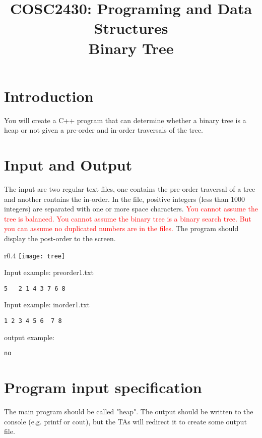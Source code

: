 \documentclass[times,11pt,verbatim,js-singlespace]{article}  %
\title{COSC2430: Programing and Data Structures\\
Binary Tree
}
\date{}
\begin{document}
\pagestyle{plain}
\let\thepage\relax  %

\maketitle

\section{Introduction}
You will create a C++ program that can determine whether a binary tree is a heap or not given a pre-order and in-order traversals of the tree.
\section{Input and Output}
The input are two regular text files, one contains the pre-order traversal of a tree and another contains the in-order. In the file, positive integers (less than 1000 integers) are separated with one or more space characters. \textcolor{red}{You cannot assume the tree is balanced. You cannot assume the binary tree is a binary search tree. But you can assume no duplicated numbers are in the files.} The program should display the post-order to the screen. 


\begin{wrapfigure}{r}{0.4\textwidth}
\hspace{-0.2in}
    \texttt{[image: tree]}
\end{wrapfigure}
Input example: preorder1.txt
\begin{verbatim}
5   2 1 4 3 7 6 8
\end{verbatim}
Input example: inorder1.txt
\begin{verbatim}
1 2 3 4 5 6  7 8
\end{verbatim}
output example:
\begin{verbatim}
no
\end{verbatim}

\section{Program input specification}
The main program should be called "heap". The output should be written to the console (e.g.
printf or cout), but the TAs will redirect it to create some output file.
\end{document}
